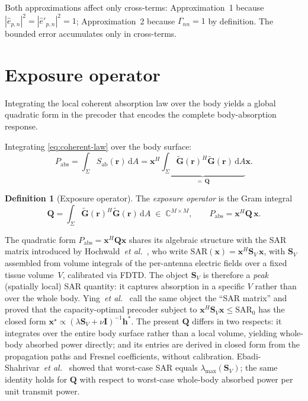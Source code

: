 \documentclass[11pt,a4paper]{article}
\theoremstyle{definition}      %
\newtheorem{definition}[definition]{Definition}
\newcommand{\rr}{\mathbf{r}}
\newcommand{\Sab}{S_{\mathrm{ab}}}
\newcommand{\diff}{\mathrm{d}}        %
\begin{document}
Both approximations affect only cross-terms: Approximation~1 because
$|\hat{e}_{p,n}|^2 = |\hat{e}'_{p,n}|^2 = 1$; Approximation~2
because $\Gamma_{nn} = 1$ by definition.  The bounded error
accumulates only in cross-terms.

\section{Exposure operator}\label{sec:exposure-operator}

Integrating the local coherent absorption law over the body yields
a global quadratic form in the precoder that encodes the complete
body-absorption response.

Integrating \cref{eq:coherent-law} over the body surface:
\begin{equation}
  P_\mathrm{abs} = \int_\Sigma \Sab(\rr)\,\diff A
  = \mathbf{x}^H \underbrace{\int_\Sigma
    \tilde{\mathbf{G}}(\rr)^H\tilde{\mathbf{G}}(\rr)\,\diff A}_{=\,\mathbf{Q}}\mathbf{x}.
\end{equation}

\begin{definition}[Exposure operator]\label{def:Q}
The \emph{exposure operator} is the Gram integral
\begin{equation}\label{eq:Q-def}
  \boxed{\mathbf{Q} = \int_\Sigma
    \tilde{\mathbf{G}}(\rr)^H\tilde{\mathbf{G}}(\rr)\,\diff A
    \;\in\; \mathbb{C}^{M\times M},
  \qquad P_\mathrm{abs} = \mathbf{x}^H\mathbf{Q}\,\mathbf{x}.}
\end{equation}
\end{definition}

The quadratic form $P_\mathrm{abs} = \mathbf{x}^H\mathbf{Q}\mathbf{x}$
shares its algebraic structure with the SAR matrix introduced by
Hochwald~\textit{et al.}~\cite{Hochwald2014}, who write
$\mathrm{SAR}(\mathbf{x}) = \mathbf{x}^H\mathbf{S}_V\,\mathbf{x}$,
with $\mathbf{S}_V$ assembled from volume integrals of the per-antenna
electric fields over a fixed tissue volume~$V$, calibrated via FDTD.
The object $\mathbf{S}_V$ is therefore a \emph{peak} (spatially local)
SAR quantity: it captures absorption in a specific $V$ rather than over
the whole body.
Ying~\textit{et al.}~\cite{Ying2015} call the same object the ``SAR matrix''
and proved that the capacity-optimal precoder subject to
$\mathbf{x}^H\mathbf{S}_V\mathbf{x}\le\mathrm{SAR}_0$ has the closed form
$\mathbf{x}^{\star}\propto(\lambda\mathbf{S}_V+\nu\mathbf{I})^{-1}\mathbf{h}^*$.
The present $\mathbf{Q}$ differs in two respects: it integrates over the
entire body surface rather than a local volume, yielding whole-body
absorbed power directly; and its entries are derived in closed form
from the propagation paths and Fresnel coefficients, without calibration.
Ebadi-Shahrivar~\textit{et al.}~\cite{Ebadi2019} showed that
worst-case SAR equals $\lambda_{\max}(\mathbf{S}_V)$; the same
identity holds for $\mathbf{Q}$ with respect to worst-case whole-body
absorbed power per unit transmit power.
\end{document}
